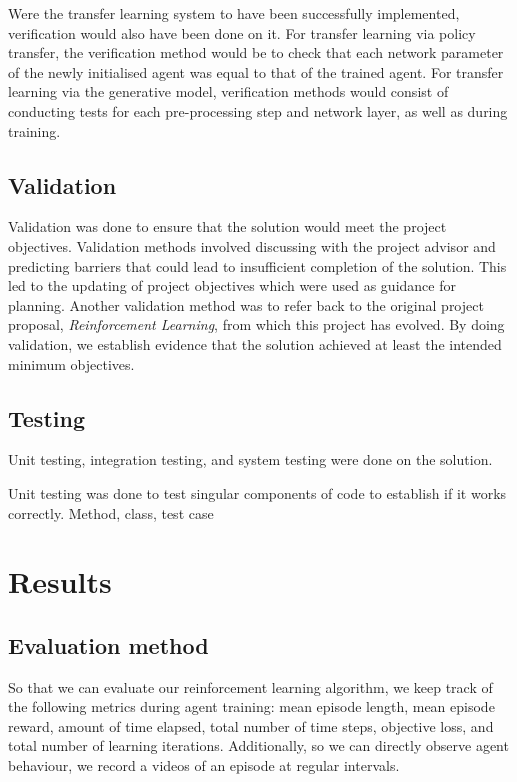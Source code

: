 \documentclass[12pt,a4paper]{article}
\begin{document}
Were the transfer learning system to have been successfully implemented, verification would also have been done on it. For transfer learning via policy transfer, the verification method would be to check that each network parameter of the newly initialised agent was equal to that of the trained agent. For transfer learning via the generative model, verification methods would consist of conducting tests for each pre-processing step and network layer, as well as during training.

\subsection{Validation}
Validation was done to ensure that the solution would meet the project objectives. Validation methods involved discussing with the project advisor and predicting barriers that could lead to insufficient completion of the solution. This led to the updating of project objectives which were used as guidance for planning. Another validation method was to refer back to the original project proposal, \textit{Reinforcement Learning}, from which this project has evolved. By doing validation, we establish evidence that the solution achieved at least the intended minimum objectives.  

\subsection{Testing}
Unit testing, integration testing, and system testing were done on the solution.

Unit testing was done to test singular components of code to establish if it works correctly. Method, class, test case

\newpage
\section{Results}
\subsection{Evaluation method}
So that we can evaluate our reinforcement learning algorithm, we keep track of the following metrics during agent training: mean episode length, mean episode reward, amount of time elapsed, total number of time steps, objective loss, and total number of learning iterations. Additionally, so we can directly observe agent behaviour, we record a videos of an episode at regular intervals.
\end{document}

